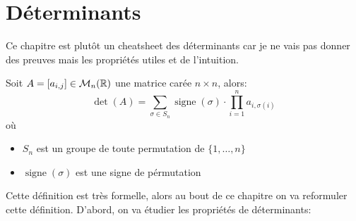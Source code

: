 \chapter{Déterminants}
Ce chapitre est plutôt un cheatsheet des déterminants car je ne vais pas donner des preuves mais les propriétés utiles et de l'intuition.

\begin{definition}
    Soit $A = [a_{i, j}] \in \mathcal{M}_{n}(\mathbb{R})$ une matrice carée $n \times n$, alors:
    \[
        \operatorname{det}(A) = \sum_{\sigma \in S_n}^{} \operatorname{signe}(\sigma) \cdot \prod_{i=1}^{n} a_{i, \sigma(i)} 
    \] 
    où 
    \begin{itemize}
        \item $S_n$ est un groupe de toute permutation de  $\{1, \ldots, n\}$
        \item $\operatorname{signe}(\sigma)$ est une signe de pérmutation
    \end{itemize}
\end{definition}

Cette définition est très formelle, alors au bout de ce chapitre on va reformuler cette définition. D'abord, on va étudier les propriétés de déterminants:

